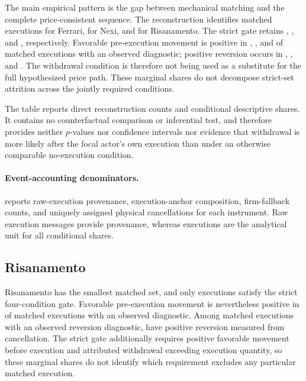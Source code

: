 \documentclass[11pt]{article}
\newenvironment{review}{\begingroup\color{blue}}{\endgroup}
\begin{document}
\FloatBarrier

The main empirical pattern is the gap between mechanical matching and the complete price-consistent sequence. The
reconstruction identifies \FerrariMatchedClusters{} matched executions for Ferrari, \NexiMatchedClusters{} for Nexi, and
\RisanamentoMatchedClusters{} for Risanamento. The strict gate retains \FerrariCompatibleSequences{},
\NexiCompatibleSequences{}, and \RisanamentoCompatibleSequences{}, respectively. Favorable pre-execution movement is
positive in \FerrariFPMShare{}, \NexiFPMShare{}, and \RisanamentoFPMShare{} of matched executions with an observed diagnostic;
positive reversion occurs in \FerrariREVShare{}, \NexiREVShare{}, and \RisanamentoREVShare{}. The withdrawal condition is
therefore not being used as a substitute for the full hypothesized price path. These marginal shares do not decompose
strict-set attrition across the jointly required conditions.

The table reports direct reconstruction counts and conditional descriptive shares. It contains no counterfactual comparison
or inferential test, and therefore provides neither $p$-values nor confidence intervals nor evidence that withdrawal is more
likely after the focal actor's own execution than under an otherwise comparable no-execution condition.

\paragraph{Event-accounting denominators.}
 reports raw-execution provenance, execution-anchor composition, firm-fallback
counts, and uniquely assigned physical cancellations for each instrument. Raw execution messages provide provenance,
whereas executions are the analytical unit for all conditional shares.

\subsection{Risanamento}
\label{subsec:risanamento_results}

Risanamento has the smallest matched set, and only \RisanamentoCompatibleSequences{} executions satisfy the strict
four-condition gate. Favorable pre-execution movement is nevertheless positive in \RisanamentoFPMShare{} of matched executions
with an observed diagnostic. Among matched executions with an observed reversion diagnostic, \RisanamentoREVShare{} have
\begin{review}positive reversion measured from cancellation\end{review}. The strict gate additionally requires \begin{review}positive favorable movement before execution\end{review} and
attributed withdrawal exceeding execution quantity, so these marginal shares do not identify which requirement excludes any
particular matched execution.
\end{document}
